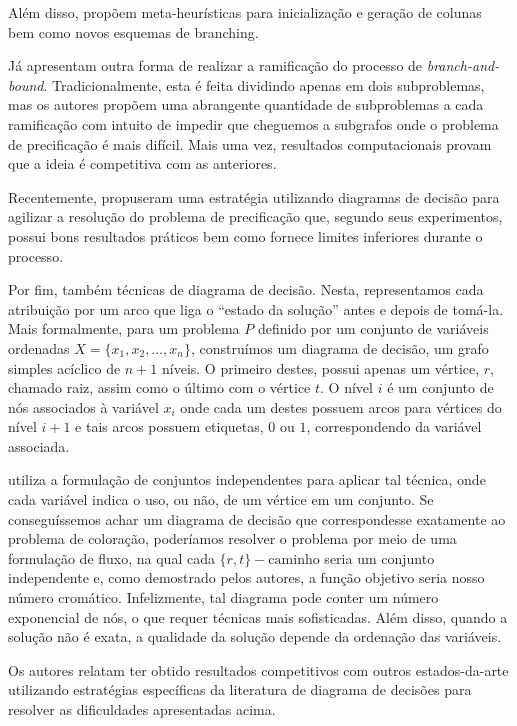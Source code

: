 \documentclass[10pt]{article}
\begin{document}
Além disso, \textcite{Malaguti2011ExactApproachVertex} propõem meta-heurísticas para inicialização e geração de colunas bem como novos esquemas de branching.

Já \textcite{Morrison2014WideBranchingStrategy} apresentam outra forma de realizar a ramificação do processo de \emph{branch-and-bound}.
Tradicionalmente, esta é feita dividindo apenas em dois subproblemas, mas os autores propõem uma abrangente quantidade de subproblemas a cada ramificação com intuito de impedir que cheguemos a subgrafos onde o problema de precificação é mais difícil.
Mais uma vez, resultados computacionais provam que a ideia é competitiva com as anteriores.

Recentemente, \textcite{Morrison2016SolvingPricingProblem} propuseram uma estratégia utilizando diagramas de decisão para agilizar a resolução do problema de precificação que, segundo seus experimentos, possui bons resultados práticos bem como fornece limites inferiores durante o processo.

Por fim,  \textcite{Hoeve2021Graphcoloringdecision} também técnicas de diagrama de decisão.
Nesta, representamos cada atribuição por um arco que liga o ``estado da solução'' antes e depois de tomá-la.
Mais formalmente, para um problema \(P\) definido por um conjunto de variáveis ordenadas \(X = \{x_1,x_2,\dots ,x_n\}\), construímos um diagrama de decisão, um grafo simples acíclico de \(n+1\) níveis.
O primeiro destes, possui apenas um vértice, \(r\), chamado raiz, assim como o último com o vértice \(t\).
O nível \(i\) é um conjunto de nós associados à variável \(x_i\) onde cada um destes possuem arcos para vértices do nível \(i+1\) e tais arcos possuem etiquetas, \(0\) ou \(1\), correspondendo da variável associada.

\textcite{Hoeve2021Graphcoloringdecision} utiliza a formulação de conjuntos independentes para aplicar tal técnica, onde cada variável indica o uso, ou não, de um vértice em um conjunto.
Se conseguíssemos achar um diagrama de decisão que correspondesse exatamente ao problema de coloração, poderíamos resolver o problema por meio de uma formulação de fluxo, na qual cada \(\{r,t\}-\text{caminho}\) seria um conjunto independente e, como demostrado pelos autores, a função objetivo seria nosso número cromático.
Infelizmente, tal diagrama pode conter um número exponencial de nós, o que requer técnicas mais sofisticadas.
Além disso, quando a solução não é exata, a qualidade da solução depende da ordenação das variáveis.

Os autores relatam ter obtido resultados competitivos com outros estados-da-arte utilizando estratégias específicas da literatura de diagrama de decisões para resolver as dificuldades apresentadas acima.
\end{document}
